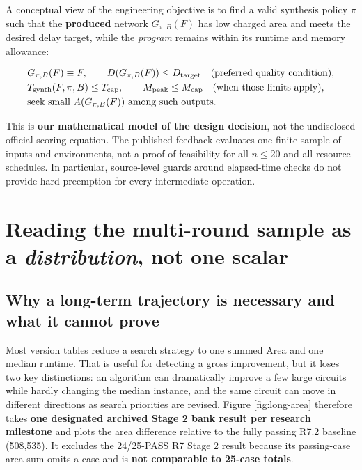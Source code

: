 A conceptual view of the engineering objective is to find a valid synthesis policy \(\pi\) such that the \textbf{produced} network \(G_{\pi,B}(F)\) has low charged area and meets the desired delay target, while the \emph{program} remains within its runtime and memory allowance:

\[
\begin{aligned}
& G_{\pi,B}(F)\equiv F,\qquad D(G_{\pi,B}(F))\le D_{\rm target}\quad\text{(preferred quality condition)},\\
& T_{\rm synth}(F,\pi,B)\le T_{\rm cap},\qquad M_{\rm peak}\le M_{\rm cap}
\quad\text{(when those limits apply)},\\
&\text{seek small } A(G_{\pi,B}(F))\text{ among such outputs.}
\end{aligned}
\]

This is \textbf{our mathematical model of the design decision}, not the undisclosed official scoring equation. The published feedback evaluates one finite sample of inputs and environments, not a proof of feasibility for all \(n\le20\) and all resource schedules. In particular, source-level guards around elapsed-time checks do not provide hard preemption for every intermediate operation.

\section{\texorpdfstring{Reading the multi-round sample as a \emph{distribution}, not one scalar}{Reading the multi-round sample as a distribution, not one scalar}}\label{reading-the-multi-round-sample-as-a-distribution-not-one-scalar}

\subsection{Why a long-term trajectory is necessary and what it cannot prove}\label{why-a-long-term-trajectory-is-necessary-and-what-it-cannot-prove}

Most version tables reduce a search strategy to one summed Area and one median runtime. That is useful for detecting a gross improvement, but it loses two key distinctions: an algorithm can dramatically improve a few large circuits while hardly changing the median instance, and the same circuit can move in different directions as search priorities are revised. Figure \ref{fig:long-area} therefore takes \textbf{one designated archived Stage 2 bank result per research milestone} and plots the area difference relative to the fully passing R7.2 baseline (508,535). It excludes the 24/25-PASS R7 Stage 2 result because its passing-case area sum omits a case and is \textbf{not comparable to 25-case totals}.

